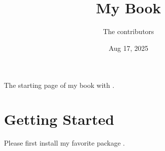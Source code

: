 \documentclass[letterpaper,11pt,english]{sphinxmanual}
\title{My Book}
\date{Aug 17, 2025}
\author{The contributors}
\begin{document}
\pagestyle{empty}
\sphinxmaketitle
\pagestyle{plain}
\sphinxtableofcontents
\pagestyle{normal}
\label{\detokenize{index::doc}}


\sphinxAtStartPar
The starting page of my book with .

\sphinxstepscope


\chapter{Getting Started}
\label{\detokenize{get_started:getting-started}}\label{\detokenize{get_started::doc}}
\sphinxAtStartPar
Please first install my favorite package .



\renewcommand{\indexname}{Index}
\printindex
\end{document}
